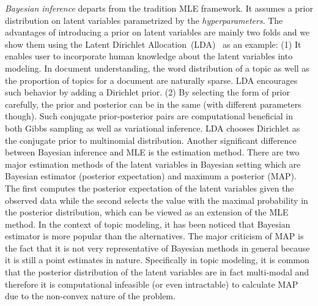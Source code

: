 \emph{Bayesian inference} departs from the tradition MLE framework. It assumes a
prior distribution on latent variables parametrized by the
\emph{hyperparameters}. The advantages of introducing a prior on latent
variables are mainly two folds and we show them using the Latent Dirichlet
Allocation~(LDA)~\cite{blei2003latent} as an example: (1) It enables user to
incorporate human knowledge about the latent variables into modeling. In
document understanding, the word distribution of a topic as well as the
proportion of topics for a document are naturally sparse. LDA encourages such
behavior by adding a Dirichlet prior. (2) By selecting the form of prior
carefully, the prior and posterior can be in the same (with different parameters
though). Such conjugate prior-posterior pairs are computational beneficial in
both Gibbs sampling as well as variational inference. LDA chooses Dirichlet as
the conjugate prior to multinomial distribution. Another significant difference
between Bayesian inference and MLE is the estimation method. There are two major
estimation methods of the latent variables in Bayesian setting which are
Bayesian estimator (posterior expectation) and maximum a posterior (MAP). The
first computes the posterior expectation of the latent variables given the
observed data while the second selects the value with the maximal probability in
the posterior distribution, which can be viewed as an extension of the MLE
method. In the context of topic modeling, it has been noticed that Bayesian
estimator is more popular than the alternatives. The major criticism of MAP is
the fact that it is not very representative of Bayesian methods in general
because it is still a point estimates in nature. Specifically in topic modeling,
it is common that the posterior distribution of the latent variables are in fact
multi-modal and therefore it is computational infeasible (or even intractable)
to calculate MAP due to the non-convex nature of the problem.

